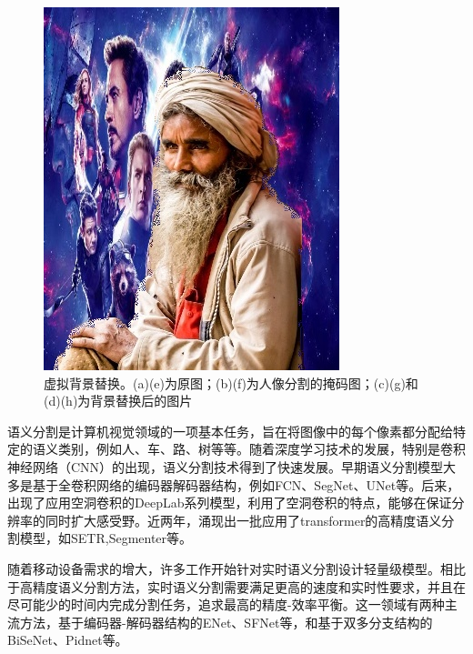 \documentclass[11pt]{article}
\begin{document}
\begin{figure}[!h]
{\begin{minipage}[t]{0.2\linewidth}
  \includegraphics[width=1\linewidth]{b4.jpg}
  \end{minipage}%
  }%
  \centering
  \caption{虚拟背景替换。(a)(e)为原图；(b)(f)为人像分割的掩码图；(c)(g)和(d)(h)为背景替换后的图片}
\end{figure}

	语义分割是计算机视觉领域的一项基本任务，旨在将图像中的每个像素都分配给特定的语义类别，例如人、车、路、树等等。随着深度学习技术的发展，特别是卷积神经网络（CNN）的出现，语义分割技术得到了快速发展。早期语义分割模型大多是基于全卷积网络的编码器解码器结构，例如FCN\cite{ref1}、SegNet\cite{ref2}、UNet\cite{ref3}等。后来，出现了应用空洞卷积的DeepLab系列模型\cite{ref4}，利用了空洞卷积的特点，能够在保证分辨率的同时扩大感受野。近两年，涌现出一批应用了transformer的高精度语义分割模型，如SETR\cite{ser},Segmenter\cite{segm}等。
	
	随着移动设备需求的增大，许多工作开始针对实时语义分割设计轻量级模型。相比于高精度语义分割方法，实时语义分割需要满足更高的速度和实时性要求，并且在尽可能少的时间内完成分割任务，追求最高的精度-效率平衡。这一领域有两种主流方法，基于编码器-解码器结构的ENet\cite{ref7}、SFNet\cite{ref34}等，和基于双多分支结构的BiSeNet\cite{ref6}、Pidnet\cite{ref41}等。
	
\end{document}
